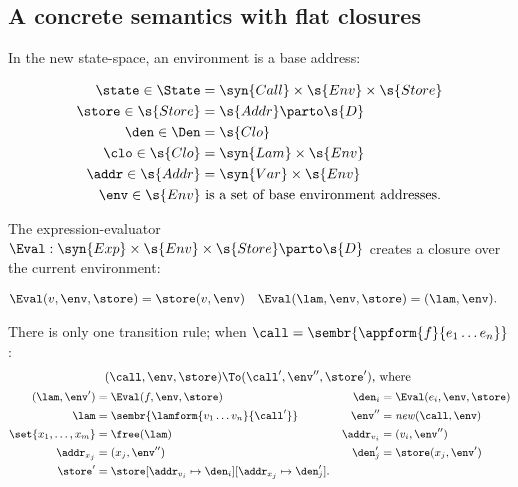 \subsection{A concrete semantics with flat closures}

In the new state-space, an environment is a base address:
\begin{small}\begin{align*}
  \state \in \State &=
  \syn{Call} \times 
  \s{Env} \times
  \s{Store}
  \\
  \store \in \s{Store} &= \s{Addr} \parto \s{D}
  \\
  \den \in \Den &= \s{Clo}
  \\
  \clo \in \s{Clo} &= \syn{Lam} \times \s{Env}
  \\
  \addr \in \s{Addr} &= \syn{Var} \times \s{Env}
  \\
  \env \in \s{Env} &\text{ is a set of base environment addresses}
  \text.
\end{align*}\end{small}

The expression-evaluator $\Eval : \syn{Exp} \times \s{Env} \times
\s{Store} \parto \s{D}$ creates a closure over the current
environment:
\begin{small}\begin{align*}
  \Eval(v,\env,\store) &= \store(v,\env)
  &
  \Eval(\lam,\env,\store) &= (\lam,\env) 
  \text.
\end{align*}\end{small}There is only one transition rule;
when $\call = \sembr{\appform{f}{e_1 \ldots e_n}}$:
\begin{gather*}
  (\call,\env,\store) 
  \To
  (\call',\env'',\store')\text{, where }
  \\
\begin{small}\begin{align*}
  (\lam,\env') &= \Eval(f,\env,\store)
  &
  \den_i &= \Eval(e_i,\env,\store)
  \\
  \lam &= \sembr{\lamform{v_1 \ldots v_n}{\call'}}
  &
  \env'' &= \mathit{new}(\call,\env)
  \\
  \set{x_1,\ldots,x_m} &= \free(\lam)  
  &
  \addr_{v_i} &= (v_i,\env'')
  \\
  \addr_{x_j} &= (x_j,\env'')
  &
  \den'_j &= \store(x_j,\env')
  \\
  \store' &= \store
  [\addr_{v_i} \mapsto \den_i]
  [\addr_{x_j} \mapsto \den'_j]
  \text.
\end{align*}\end{small}\end{gather*}







